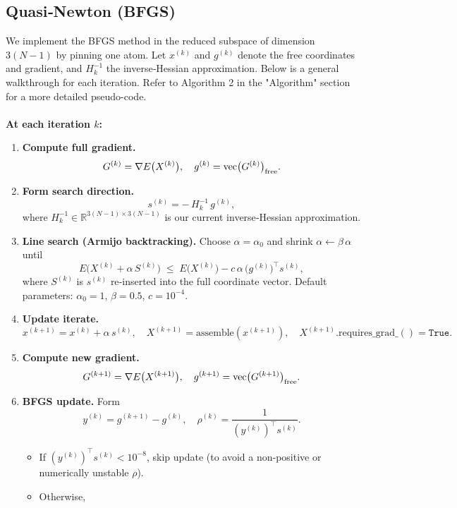 \documentclass[11pt,onecolumn]{article}
\begin{document}
\subsection{Quasi‑Newton (BFGS)}
We implement the BFGS method in the reduced subspace of dimension $3(N-1)$ by pinning one atom. Let $x^{(k)}$ and $g^{(k)}$ denote the free coordinates and gradient, and $H_k^{-1}$ the inverse‑Hessian approximation. Below is a general walkthrough for each iteration. Refer to Algorithm 2 in the "Algorithm" section for a more detailed pseudo-code.\\
\\
\noindent
\textbf {At each iteration \(k\):}
\begin{enumerate}
  \item \textbf{Compute full gradient.}  
    \[
      G^{(k)} = \nabla E\bigl(X^{(k)}\bigr),
      \quad
      g^{(k)} = \text{vec}\bigl(G^{(k)}\bigr)_{\rm free}.
    \]
  \item \textbf{Form search direction.}  
    \[
      s^{(k)} = -\,H_k^{-1}\,g^{(k)},
    \]
    where \(H_k^{-1}\in\mathbb R^{3(N-1)\times3(N-1)}\) is our current inverse‑Hessian approximation.
  \item \textbf{Line search (Armijo backtracking).}  
    Choose \(\alpha=\alpha_0\) and shrink \(\alpha\leftarrow\beta\,\alpha\) until
    \[
      E\bigl(X^{(k)} + \alpha\,S^{(k)}\bigr)
      \;\le\;
      E\bigl(X^{(k)}\bigr)
      -c\,\alpha\,\bigl(g^{(k)}\bigr)^\top s^{(k)},
    \]
    where \(S^{(k)}\) is \(s^{(k)}\) re‑inserted into the full coordinate vector.  Default parameters: \(\alpha_0=1\), \(\beta=0.5\), \(c=10^{-4}\).
  \item \textbf{Update iterate.}
    \[
      x^{(k+1)} = x^{(k)} + \alpha\,s^{(k)},
      \quad
      X^{(k+1)} = \text{assemble}(x^{(k+1)}),
      \quad
      X^{(k+1)}.\mathrm{requires\_grad\_()} = \texttt{True}.
    \]
  \item \textbf{Compute new gradient.}  
    \[
      G^{(k+1)} = \nabla E\bigl(X^{(k+1)}\bigr),
      \quad
      g^{(k+1)} = \text{vec}\bigl(G^{(k+1)}\bigr)_{\rm free}.
    \]
  \item \textbf{BFGS update.}  
    Form
    \[
      y^{(k)} = g^{(k+1)} - g^{(k)},\quad
      \rho^{(k)} = \frac{1}{(y^{(k)})^\top s^{(k)}}.
    \]
    \begin{itemize}
      \item If \((y^{(k)})^\top s^{(k)} < 10^{-8}\), skip update (to avoid a non‑positive or numerically unstable \(\rho\)).
      \item Otherwise,

\end{itemize}
\end{enumerate}
\end{document}
